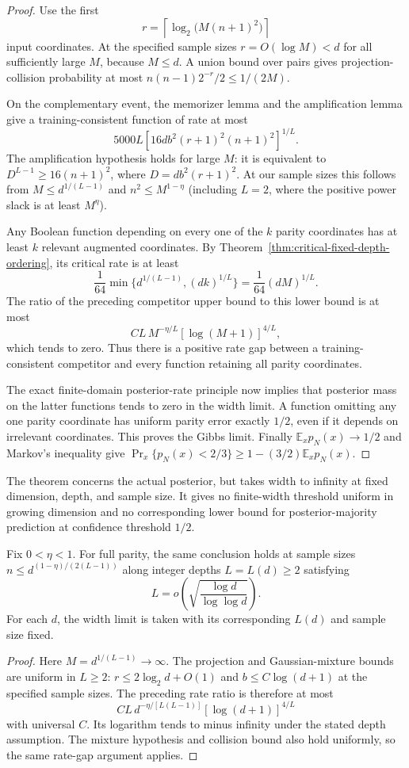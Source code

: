 \begin{proof}
Use the first
\[
 r=\left\lceil\log_2\bigl(M(n+1)^2\bigr)\right\rceil
\]
input coordinates. At the specified sample sizes $r=O(\log M)<d$
for all sufficiently large $M$, because $M\le d$. A union bound over pairs gives
projection-collision probability at most
$n(n-1)2^{-r}/2\le1/(2M)$.

On the complementary event, the memorizer lemma and the amplification
lemma give a training-consistent function of rate at most
\[
 5000L\left[16d b^2(r+1)^2(n+1)^2\right]^{1/L}.
\]
The amplification hypothesis holds for large $M$: it is equivalent
to $D^{L-1}\ge16(n+1)^2$, where $D=d b^2(r+1)^2$.
At our sample sizes this follows from $M\le d^{1/(L-1)}$ and
$n^2\le M^{1-\eta}$ (including $L=2$, where the positive power
slack is at least $M^\eta$).

Any Boolean function depending on every one of the $k$ parity coordinates
has at least $k$ relevant augmented coordinates. By
Theorem~\ref{thm:critical-fixed-depth-ordering}, its critical rate is at least
\[
 \frac1{64}\min\{d^{1/(L-1)},(dk)^{1/L}\}
       =\frac1{64}(dM)^{1/L}.
\]
The ratio of the
preceding competitor upper bound to this lower bound is at most
\[
 C L\,M^{-\eta/L}[\log(M+1)]^{4/L},
\]
which tends to zero. Thus there is a positive rate gap between a
training-consistent competitor and every function retaining all
parity coordinates.

The exact finite-domain posterior-rate principle now implies that
posterior mass on the latter functions tends to zero in the width
limit. A function omitting any one parity coordinate has uniform
parity error exactly $1/2$, even if it depends on irrelevant coordinates.
This proves the Gibbs limit. Finally
$\mathbb E_xp_N(x)\to1/2$ and Markov's inequality give
$\Pr_x\{p_N(x)<2/3\}\ge1-(3/2)\mathbb E_xp_N(x)$.
\end{proof}

The theorem concerns the actual posterior, but takes width to infinity
at fixed dimension, depth, and sample size. It gives no finite-width
threshold uniform in growing dimension and no corresponding lower
bound for posterior-majority prediction at confidence threshold $1/2$.

\begin{corollary}
\label{cor:critical-growing-depth-sample-lower}
Fix $0<\eta<1$. For full parity, the same conclusion holds at sample sizes
$n\le d^{(1-\eta)/(2(L-1))}$ along integer depths $L=L(d)\ge2$ satisfying
\[
 L=o\!\left(\sqrt{\frac{\log d}{\log\log d}}\right).
\]
For each $d$, the width limit is taken with its corresponding $L(d)$
and sample size fixed.
\end{corollary}

\begin{proof}
Here $M=d^{1/(L-1)}\to\infty$. The projection and Gaussian-mixture bounds
are uniform in $L\ge2$:
$r\le2\log_2d+O(1)$ and $b\le C\log(d+1)$ at the specified sample
sizes. The preceding rate ratio is therefore at most
\[
 C L\,d^{-\eta/[L(L-1)]}[\log(d+1)]^{4/L}
\]
with universal $C$. Its logarithm tends to minus infinity under the
stated depth assumption. The mixture hypothesis and collision bound
also hold uniformly, so the same rate-gap argument applies.
\end{proof}
